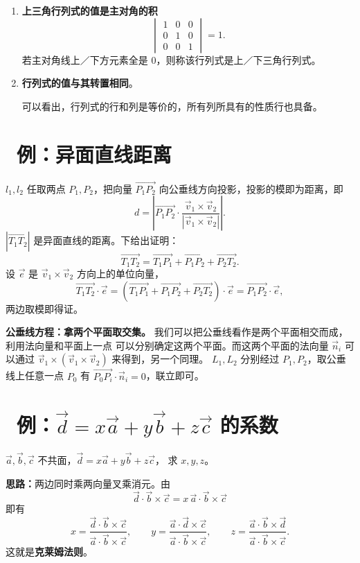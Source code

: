 \documentclass[UTF8,11pt]{ctexart}
\theoremstyle{cnthm}
\begin{document}
\begin{enumerate}
\[
\begin{vmatrix}
a_{11}+ka_{12} & a_{12} & a_{13}\\
a_{21}+ka_{22} & a_{22} & a_{23}\\
a_{31}+ka_{32} & a_{32} & a_{33}
\end{vmatrix}
=
\begin{vmatrix}
a_{11} & a_{12} & a_{13}\\
a_{21} & a_{22} & a_{23}\\
a_{31} & a_{32} & a_{33}
\end{vmatrix}.
\]
\item \textbf{上三角行列式的值是主对角的积}
\[
\begin{vmatrix}
1 & 0 & 0\\
0 & 1 & 0\\
0 & 0 & 1
\end{vmatrix}=1 .
\]
若主对角线上／下方元素全是 $0$，则称该行列式是上／下三角行列式。
\item \textbf{行列式的值与其转置相同}。

可以看出，行列式的行和列是等价的，所有列所具有的性质行也具备。
\end{enumerate}

\section{\ 例：异面直线距离}

$l_1,l_2$ 任取两点 $P_1,P_2$，把向量
$\overrightarrow{P_1P_2}$ 向公垂线方向投影，投影的模即为距离，即
\[
d=\left|
\overrightarrow{P_1P_2}\cdot
\frac{\vec v_1\times\vec v_2}{|\vec v_1\times\vec v_2|}
\right| .
\]
$|\overrightarrow{T_1T_2}|$ 是异面直线的距离。下给出证明：
\[
\overrightarrow{T_1T_2}
=\overrightarrow{T_1P_1}+\overrightarrow{P_1P_2}
+\overrightarrow{P_2T_2} .
\]
设 $\vec e$ 是 $\vec v_1\times\vec v_2$ 方向上的单位向量，
\[
\overrightarrow{T_1T_2}\cdot\vec e
=\left(\overrightarrow{T_1P_1}+\overrightarrow{P_1P_2}
+\overrightarrow{P_2T_2}\right)\cdot\vec e
=\overrightarrow{P_1P_2}\cdot\vec e,
\]
两边取模即得证。

\textbf{公垂线方程：拿两个平面取交集。}\quad
我们可以把公垂线看作是两个平面相交而成，利用法向量和平面上一点
可以分别确定这两个平面。而这两个平面的法向量 $\vec n_i$ 可以通过
$\vec v_1\times(\vec v_1\times\vec v_2)$ 来得到，另一个同理。
$L_1,L_2$ 分别经过 $P_1,P_2$，取公垂线上任意一点 $P_0$ 有
$\overrightarrow{P_0P_i}\cdot\vec n_i=0$，联立即可。

\section{\ 例：$\vec d=x\vec a+y\vec b+z\vec c$ 的系数}

$\vec a,\vec b,\vec c$ 不共面，$\vec d=x\vec a+y\vec b+z\vec c$，
求 $x,y,z$。

\textbf{思路：}两边同时乘两向量叉乘消元。由
\[
\vec d\cdot\vec b\times\vec c
=x\,\vec a\cdot\vec b\times\vec c
\]
即有
\[
x=\frac{\vec d\cdot\vec b\times\vec c}
{\vec a\cdot\vec b\times\vec c},\qquad
y=\frac{\vec a\cdot\vec d\times\vec c}
{\vec a\cdot\vec b\times\vec c},\qquad
z=\frac{\vec a\cdot\vec b\times\vec d}
{\vec a\cdot\vec b\times\vec c} .
\]
这就是\textbf{克莱姆法则}。
\end{document}
